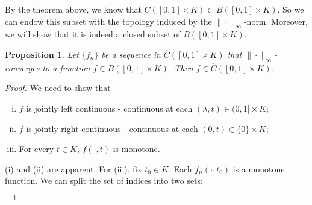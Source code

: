 \documentclass{amsart}
\newtheorem{proposition}[theorem]{Proposition}
\begin{document}
By the theorem above, we know that $\overline{C}([0,1]\times K)\subset B([0,1]\times K)$.
So we can endow this subset with the topology induced by the $\|\cdot\|_{\infty}$-norm. Moreover,
we will show that it is indeed a closed subset of $B([0,1]\times K)$.
\begin{proposition}\label{prop:unifconv1}
Let $\{f_n\}$ be a sequence in $\overline{C}([0,1]\times K)$ that $\| \cdot\|_{\infty}$-converges to a function $f\in B([0,1]\times K)$. Then
$f\in \overline{C}([0,1]\times K)$.
\end{proposition}
\begin{proof}
We need to show that
\begin{enumerate}[(i)]
\item $f$ is jointly left continuous - continuous at each $(\lambda,t)\in(0,1]\times K$;
\item $f$ is jointly right continuous - continuous at each  $(0,t)\in\{0\}\times K$;
\item For every $t\in K$, $f(\cdot,t)$ is monotone.
\end{enumerate}
(i) and (ii) are apparent. For (iii), fix $t_0\in K$. Each $f_n(\cdot,t_0)$ is a monotone function. We can split the set of indices into two sets:
\begin{align*}

\end{align*}
\end{proof}
\end{document}
